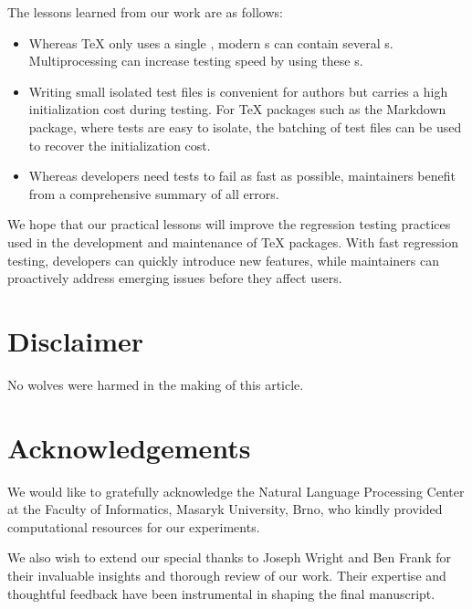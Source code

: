 \documentclass[final]{ltugboat}
\begin{document}
The lessons learned from our work are as follows:

\begin{itemize}
\item Whereas \TeX{} only uses a single , modern s can contain several s. Multiprocessing can increase testing speed by using these s.
\item Writing small isolated test files is convenient for authors but carries a high initialization cost during testing. For \TeX{} packages such as the Markdown package, where tests are easy to isolate, the batching of test files can be used to recover the initialization cost.
\item Whereas developers need tests to fail as fast as possible, maintainers benefit from a comprehensive summary of all errors.
\end{itemize}

We hope that our practical lessons will improve the regression testing practices used in the development and maintenance of \TeX{} packages. With fast regression testing, developers can quickly introduce new features, while maintainers can proactively address emerging issues before they affect users.

\medskip
\noindent


\section*{Disclaimer}
No wolves were harmed in the making of this article.

\section*{Acknowledgements}
We would like to gratefully acknowledge the Natural Language Processing Center at the Faculty of Informatics, Masaryk University, Brno, who kindly provided computational resources for our experiments.

We also wish to extend our special thanks to Joseph Wright and Ben Frank for their invaluable insights and thorough review of our work. Their expertise and thoughtful feedback have been instrumental in shaping the final manuscript.


\begingroup
\gappto{\UrlBreaks}{\UrlOrds}

\endgroup

\makesignature
\end{document}
